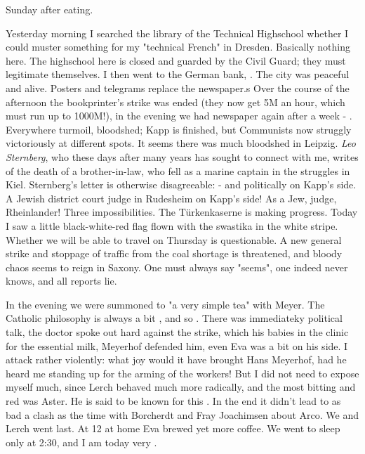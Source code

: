 \documentclass{article}
\begin{document}
\date{March 21, 1920}
Sunday after eating.

Yesterday morning I searched the library of the Technical Highschool  whether I could muster something for my "technical French" in Dresden. Basically nothing here. \skipped The highschool here is closed and guarded by the Civil Guard; they must legitimate themselves. I then went to the German bank, . The city was peaceful and alive. Posters and telegrams replace the newspaper.s Over the course of the afternoon the bookprinter's strike was ended (they now get 5M an hour, which must run up to 1000M!), in the evening we had newspaper again after a week - . Everywhere turmoil, bloodshed; Kapp is finished, but Communists now struggly victoriously at different spots. It seems there was much bloodshed
in Leipzig. \textit{Leo Sternberg}, who these days after many years has sought to connect with me, writes of the death of a brother-in-law, who fell as a marine captain in the struggles in Kiel. Sternberg's letter is otherwise disagreeable:  - and politically on Kapp's side. A Jewish district court judge in Rudesheim on Kapp's side! As a Jew, judge, Rheinlander! Three impossibilities.
The T\"urkenkaserne is making progress. Today I saw a little black-white-red flag flown with the swastika in the white stripe.
Whether we will be able to travel on Thursday is questionable. A new general strike and stoppage of traffic from the coal shortage is threatened, and bloody chaos seems to reign in Saxony. One must always say "seems", one indeed never knows, and all reports lie.

In the evening we were summoned to "a very simple tea" with Meyer. The Catholic philosophy is always a bit , and so .  There was immediateky political talk, the doctor spoke out hard against the strike, which  his babies in the clinic for the essential milk, Meyerhof defended him, even Eva was a bit on his side. I attack rather violently: what joy would it have brought Hans Meyerhof, had he heard me standing up for the arming of the workers! But I did not need to expose myself much, since Lerch behaved much more radically, and the most bitting and red was Aster. He is said to be known for this . In the end it didn't lead to as bad a clash as the time with Borcherdt and Fray Joachimsen about Arco. We and Lerch went last. At 12 at home Eva brewed yet more coffee. We went to sleep only at 2:30, and I am today very .
\end{document}
